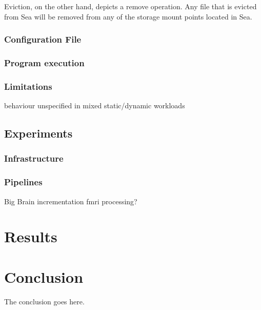 \documentclass[10pt,journal,compsoc]{IEEEtran}
\begin{document}
Eviction, on the other hand, depicts a remove operation. Any file that is evicted from Sea will be removed from any of the storage mount
points located in Sea. 

\subsubsection{Configuration File}
\subsubsection{Program execution}
\subsubsection{Limitations}
behaviour unspecified in mixed static/dynamic workloads

\subsection{Experiments}
\subsubsection{Infrastructure}
\subsubsection{Pipelines}
Big Brain incrementation
fmri processing?

\section{Results}


\section{Conclusion}
The conclusion goes here.





\end{document}
